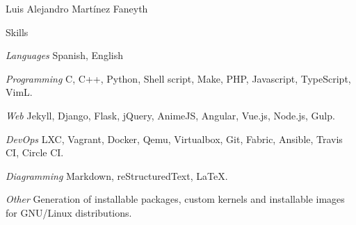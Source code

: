 \documentclass[10pt,letterpaper]{article}
\begin{document}
\begin{cv}{Luis Alejandro Mart\'inez Faneyth}
\begin{cvlist}{Skills}
\item[\textit{\large{Languages}}]{Spanish, English}
\item[\textit{\large{Programming}}]{C, C++, Python, Shell script, Make, PHP, Javascript, TypeScript, VimL.}
\item[\textit{\large{Web}}]{Jekyll, Django, Flask, jQuery, AnimeJS, Angular, Vue.js, Node.js, Gulp.}
\item[\textit{\large{DevOps}}]{LXC, Vagrant, Docker, Qemu, Virtualbox, Git, Fabric, Ansible, Travis CI, Circle CI.}
\item[\textit{\large{Diagramming}}]{Markdown, reStructuredText, \LaTeX.}
\item[\textit{\large{Other}}]{
	Generation of installable packages, custom kernels and installable images for GNU/Linux distributions.\\
}
\end{cvlist}

\end{cv}
\end{document}
